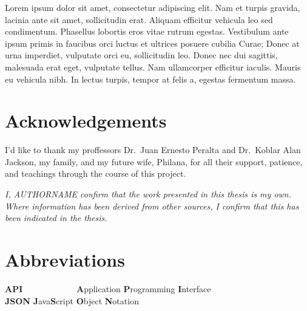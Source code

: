 \documentclass[12pt,a4paper,]{report}
\begin{document}
Lorem ipsum dolor sit amet, consectetur adipiscing elit. Nam et turpis
gravida, lacinia ante sit amet, sollicitudin erat. Aliquam efficitur
vehicula leo sed condimentum. Phasellus lobortis eros vitae rutrum
egestas. Vestibulum ante ipsum primis in faucibus orci luctus et
ultrices posuere cubilia Curae; Donec at urna imperdiet, vulputate orci
eu, sollicitudin leo. Donec nec dui sagittis, malesuada erat eget,
vulputate tellus. Nam ullamcorper efficitur iaculis. Mauris eu vehicula
nibh. In lectus turpis, tempor at felis a, egestas fermentum massa.

\setcounter{page}{1}

\chapter*{Acknowledgements}\label{acknowledgements}

I'd like to thank my proffessors Dr.~Juan Ernesto Peralta and Dr.~Koblar
Alan Jackson, my family, and my future wife, Philana, for all their
support, patience, and teachings through the course of this project.

\newpage


\tableofcontents

\newpage

\vspace*{\fill}

\noindent \textit{
I, AUTHORNAME confirm that the work presented in this thesis is my own. Where information has been derived from other sources, I confirm that this has been indicated in the thesis.
} \vspace*{\fill}  \newpage

\chapter*{Abbreviations}\label{abbreviations}

\begin{tabbing}
\textbf{API}~~~~~~~~~~~~ \= \textbf{A}pplication \textbf{P}rogramming \textbf{I}nterface \\  
\textbf{JSON} \> \textbf{J}ava\textbf{S}cript \textbf{O}bject \textbf{N}otation \\  
\end{tabbing}

\newpage
\end{document}
